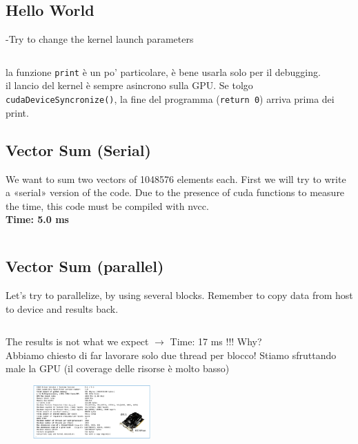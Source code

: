 \subsection{Hello World}
-Try to change the kernel launch parameters

\inputminted{c}{cuda/HelloWordGpu.cu}

la funzione \texttt{print} è un po' particolare, è bene usarla solo per il debugging.\\

il lancio del kernel è sempre asincrono sulla GPU. Se tolgo \texttt{cudaDeviceSyncronize()}, la fine del programma (\texttt{return 0}) arriva prima dei print.



\subsection{Vector Sum (Serial)}
We want to sum two vectors of 1048576 elements each. First we will try to write a «serial» version of the code. Due to the presence of cuda functions to measure the time, this code must be compiled with nvcc.\\

\textbf{Time: 5.0 ms}
\inputminted{c}{cuda/VecAdd_Serial.cu}

\subsection{Vector Sum (parallel)}

Let’s try to parallelize, by using several blocks. Remember to copy data from host to device and results back. 

\inputminted{c}{cuda/VecAdd_WithBlocks.cu}

The results is not what we expect $\rightarrow$ Time: 17 ms !!! Why?\\


Abbiamo chiesto di far lavorare solo due thread per blocco! Stiamo sfruttando male la GPU (il coverage delle risorse è molto basso)

\begin{figure}[ht]
	\centering
	\includegraphics[width=0.4\textwidth]{figure_parallel/gtx650.png}
\end{figure}

